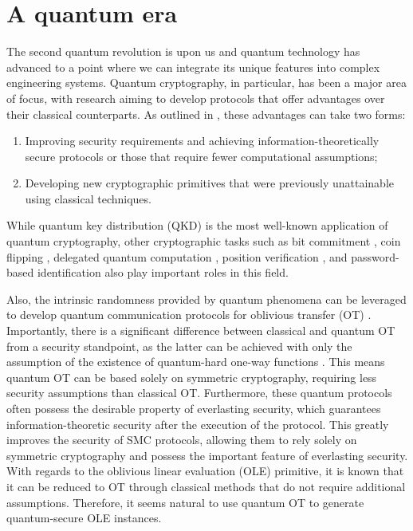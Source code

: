 \section*{A quantum era}

The second quantum revolution is upon us and quantum technology has advanced to a point where we can integrate its unique features into complex engineering systems. Quantum cryptography, in particular, has been a major area of focus, with research aiming to develop protocols that offer advantages over their classical counterparts. As outlined in \cite{B15, PSAN13}, these advantages can take two forms:

\begin{enumerate}
\item Improving security requirements and achieving information-theoretically secure protocols or those that require fewer computational assumptions;
\item Developing new cryptographic primitives that were previously unattainable using classical techniques.
\end{enumerate}
While quantum key distribution (QKD) is the most well-known application of quantum cryptography, other cryptographic tasks such as bit commitment \cite{CK11}, coin flipping \cite{CK09}, delegated quantum computation \cite{BFK09}, position verification \cite{Unr14}, and password-based identification \cite{DFSS14, DFLSS09} also play important roles in this field.

Also, the intrinsic randomness provided by quantum phenomena can be leveraged to develop quantum communication protocols for oblivious transfer (OT) \cite{BBCS92}. Importantly, there is a significant difference between classical and quantum OT from a security standpoint, as the latter can be achieved with only the assumption of the existence of quantum-hard one-way functions \cite{GLSV21, BCKM21}. This means quantum OT can be based solely on symmetric cryptography, requiring less security assumptions than classical OT. Furthermore, these quantum protocols often possess the desirable property of everlasting security, which guarantees information-theoretic security after the execution of the protocol. This greatly improves the security of SMC protocols, allowing them to rely solely on symmetric cryptography and possess the important feature of everlasting security. With regards to the oblivious linear evaluation (OLE) primitive, it is known that it can be reduced to OT \cite{KOS16} through classical methods that do not require additional assumptions. Therefore, it seems natural to use quantum OT to generate quantum-secure OLE instances.


